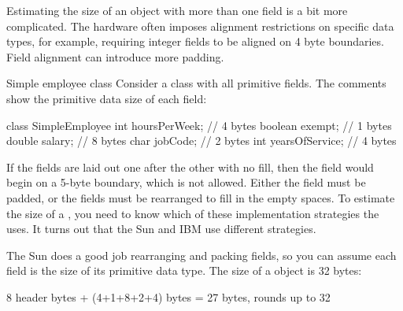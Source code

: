 Estimating the size of an object with more than one field is a bit more complicated. The hardware often imposes alignment restrictions on specific data types, for example, requiring integer fields to be aligned on 4 byte boundaries. Field alignment can introduce more padding.
 
\begin{example}{Simple employee class}
Consider a  class with all primitive fields. The comments
show the primitive data size of each field:
\begin{shortlisting}
class SimpleEmployee {
    int hoursPerWeek;        // 4 bytes 
    boolean exempt;          // 1 bytes
    double salary;           // 8 bytes
    char jobCode;            // 2 bytes
    int yearsOfService;      // 4 bytes	
}
\end{shortlisting}
If the fields are laid out one after the other with no fill, then the
 field  would begin on a 5-byte boundary, which is
not allowed. Either the  field must be padded, or the fields must
be rearranged to fill in the empty spaces. To estimate the size of a
, you need to know which of these implementation
strategies the \jre uses. It turns out that the Sun and IBM use different
strategies.
\end{example}

The Sun \jre does a good job rearranging and packing fields, so you can assume
each field is the size of its primitive data type. The size of a
 object is 32 bytes:
\begin{shortlisting}               
8 header bytes + (4+1+8+2+4) bytes = 27 bytes, rounds up to 32
\end{shortlisting} 

